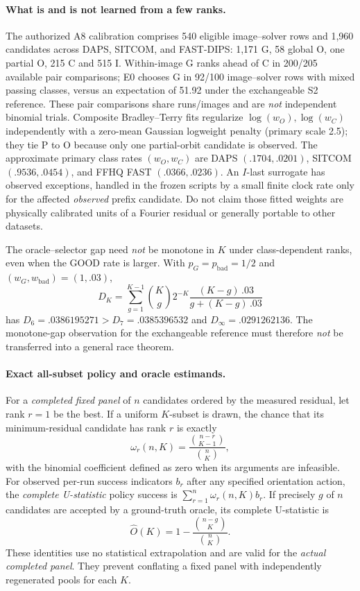\paragraph{What is and is not learned from a few ranks.}
The authorized A8 calibration comprises 540 eligible image--solver
rows and 1,960 candidates across DAPS, SITCOM, and FAST-DIPS:
1,171 G, 58 global O, one partial O, 215 C and 515 I.
Within-image G ranks ahead of C in 200/205 available pair comparisons;
E0 chooses G in 92/100 image--solver rows with mixed passing classes,
versus an expectation of 51.92 under the exchangeable S2 reference.
These pair comparisons share runs/images and are \emph{not}
independent binomial trials. Composite Bradley--Terry fits regularize
$\log(w_O),\log(w_C)$ independently with a zero-mean Gaussian
logweight penalty (primary scale 2.5); they tie P to O because only
one partial-orbit candidate is observed. The approximate primary
class rates $(w_O,w_C)$ are DAPS $(.1704,.0201)$, SITCOM
$(.9536,.0454)$, and FFHQ FAST $(.0366,.0236)$.
An $I$-last surrogate has observed exceptions, handled in the
frozen scripts by a small finite clock rate only for the affected
\emph{observed} prefix candidate. Do not claim those fitted weights
are physically calibrated units of a Fourier residual or generally
portable to other datasets.

The oracle--selector gap need \emph{not} be monotone in $K$ under
class-dependent ranks, even when the GOOD rate is larger.
With $p_G=p_{\mathrm{bad}}=1/2$ and
$(w_G,w_{\mathrm{bad}})=(1,.03)$,
\[
 D_K=\sum_{g=1}^{K-1}\binom Kg2^{-K}
 \frac{(K-g)\,.03}{g+(K-g)\,.03}
\]
has $D_6=.0386195271>D_7=.0385396532$ and
$D_\infty=.0291262136$. The monotone-gap observation for the
exchangeable reference must therefore \emph{not} be transferred
into a general race theorem.

\paragraph{Exact all-subset policy and oracle estimands.}
For a \emph{completed fixed panel} of $n$ candidates ordered by the
measured residual, let rank $r=1$ be the best. If a uniform $K$-subset
is drawn, the chance that its minimum-residual candidate has rank
$r$ is exactly
\begin{equation}\label{eq:suppl-subset-weight}
 \omega_r(n,K)=\frac{\binom{n-r}{K-1}}{\binom nK},
\end{equation}
with the binomial coefficient defined as zero when its arguments are
infeasible. For observed per-run success indicators $b_r$ after
any specified orientation action, the \emph{complete U-statistic}
policy success is $\sum_{r=1}^n\omega_r(n,K)b_r$.
If precisely $g$ of $n$ candidates are accepted by a ground-truth
oracle, its complete U-statistic is
\begin{equation}\label{eq:suppl-oracle-subset}
 \widehat O(K)=1-\frac{\binom{n-g}{K}}{\binom nK}.
\end{equation}
These identities use no statistical extrapolation and are valid for
the \emph{actual completed panel}. They prevent conflating a fixed
panel with independently regenerated pools for each $K$.

